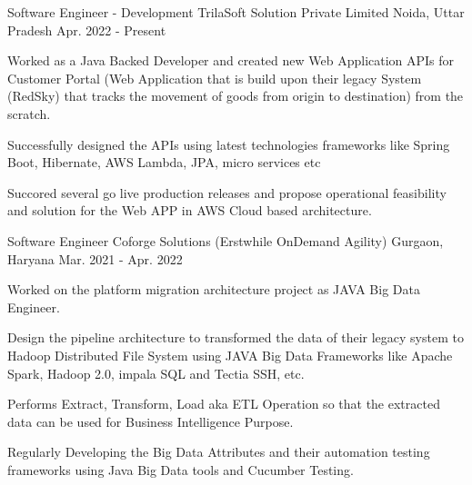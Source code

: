 

\begin{cventries}

  \cventry
    {Software Engineer - Development} %
    {TrilaSoft Solution Private Limited} %
    {Noida, Uttar Pradesh} %
    {Apr. 2022 - Present} %
    {
      \begin{cvitems} %
        \item {Worked as a Java Backed Developer and created new Web Application APIs for Customer Portal (Web Application that is build upon their legacy System (RedSky) that tracks the movement of goods from origin to destination) from the scratch.}
        \item {Successfully designed the APIs using latest technologies frameworks like Spring Boot, Hibernate, AWS Lambda, JPA, micro services etc}
        \item {Succored several go live production releases and propose operational feasibility and solution for the Web APP in AWS Cloud based architecture.}
      \end{cvitems}
    }

  \cventry
    {Software Engineer} %
    {Coforge Solutions (Erstwhile OnDemand Agility)} %
    {Gurgaon, Haryana} %
    {Mar. 2021 - Apr. 2022} %
    {
      \begin{cvitems} %
         \item {Worked on the platform migration architecture project as JAVA Big Data Engineer.}
        \item {Design the pipeline architecture to transformed the data of their legacy system to Hadoop Distributed File System using JAVA Big Data Frameworks like Apache Spark, Hadoop 2.0, impala SQL and Tectia SSH, etc.}
        \item {Performs Extract, Transform, Load aka ETL Operation so that the extracted data can be used for Business Intelligence Purpose.}
        \item {Regularly Developing the Big Data Attributes and their automation testing frameworks using Java Big Data tools and Cucumber Testing.}   
      \end{cvitems}
    }


\end{cventries}
